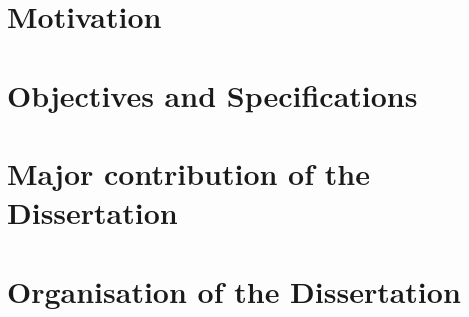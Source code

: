 \begin{spacing}{1.5}
\section{Motivation}



\section{Objectives and Specifications}



\section{Major contribution of the Dissertation}



\section{Organisation of the Dissertation}


\end{spacing}
\newpage


